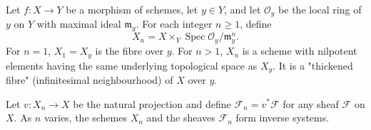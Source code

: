 Let $f: X \to Y$ be a morphism of schemes, let $y \in Y$, and let $\mathcal{O}_y$ be the local ring of $y$ on $Y$ with maximal ideal $\mathfrak{m}_y$. For each integer $n \ge 1$, define
$$X_n = X \times_Y \operatorname{Spec} \mathcal{O}_y / \mathfrak{m}_y^n.$$
For $n = 1$, $X_1 = X_y$ is the fibre over $y$. For $n > 1$, $X_n$ is a scheme with nilpotent elements having the same underlying topological space as $X_y$. It is a "thickened fibre" (infinitesimal neighbourhood) of $X$ over $y$.

Let $v: X_n \to X$ be the natural projection and define $\mathcal{F}_n = v^*\mathcal{F}$ for any sheaf $\mathcal{F}$ on $X$. As $n$ varies, the schemes $X_n$ and the sheaves $\mathcal{F}_n$ form inverse systems.
